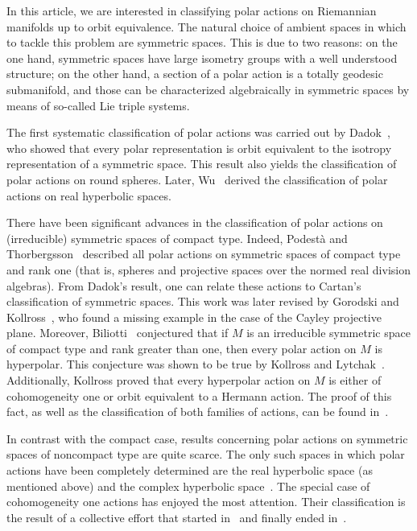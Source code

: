 \documentclass[12pt, a4paper]{amsart}
\theoremstyle{definition}
\begin{document}
In this article, we are interested in classifying polar actions on Riemannian manifolds
up to orbit equivalence.
The natural choice of ambient spaces in which to tackle this problem are symmetric spaces.
This is due to two reasons:
on the one hand, symmetric spaces have large isometry groups with a well understood structure;
on the other hand, a section of a polar action is a totally geodesic submanifold, and those can
be characterized algebraically in symmetric spaces by means of so-called Lie triple systems.

The first systematic classification of polar actions was carried out by Dadok~\cite{Dadok85},
who showed that every polar representation is orbit equivalent to the isotropy representation
of a symmetric space.
This result also yields the classification of polar actions on round spheres.
Later, Wu~\cite{Wu} derived the classification of polar actions on real hyperbolic spaces.

There have been significant advances in the classification of polar actions on (irreducible)
symmetric spaces of compact type.
Indeed, Podestà and Thorbergsson~\cite{PodestaThorbergsson99} described all polar actions
on symmetric spaces of compact type and rank one
(that is, spheres and projective spaces over the normed real division algebras).
From Dadok's result, one can relate these actions to Cartan's classification of symmetric
spaces.
This work was later revised by Gorodski and Kollross~\cite{GorodskiKollross16},
who found a missing example in the case of the Cayley projective plane.
Moreover, Biliotti~\cite{Biliotti06} conjectured that if $M$ is an irreducible symmetric
space of compact type and rank greater than one, then every polar action on $M$ is hyperpolar.
This conjecture was shown to be true by Kollross and Lytchak~\cite{KollrossLytchak13}.
Additionally, Kollross proved that every hyperpolar action on $M$ is
either of cohomogeneity one or orbit equivalent to a Hermann action.
The proof of this fact, as well as the classification of both families of actions,
can be found in~\cite{Kollross02}.

In contrast with the compact case, results concerning polar actions on symmetric spaces
of noncompact type are quite scarce.
The only such spaces in which polar actions have been completely determined
are the real hyperbolic space (as mentioned above) and the complex
hyperbolic space~\cite{DiazDominguezKollross20}.
The special case of cohomogeneity one actions has enjoyed the most attention.
Their classification is the result of a collective effort that started
in~\cite{BerndtBruck01} and finally ended in~\cite{SanmartinSolonenko25}.
\end{document}

